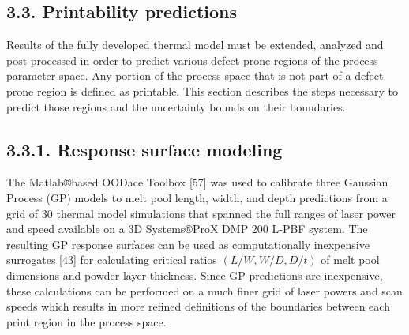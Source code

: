 \documentclass[10pt]{article}
\begin{document}
\subsection*{3.3. Printability predictions}
Results of the fully developed thermal model must be extended, analyzed and post-processed in order to predict various defect prone regions of the process parameter space. Any portion of the process space that is not part of a defect prone region is defined as printable. This section describes the steps necessary to predict those regions and the uncertainty bounds on their boundaries.

\subsection*{3.3.1. Response surface modeling}
The Matlab®based OODace Toolbox [57] was used to calibrate three Gaussian Process (GP) models to melt pool length, width, and depth predictions from a grid of 30 thermal model simulations that spanned the full ranges of laser power and speed available on a 3D Systems®ProX DMP 200 L-PBF system. The resulting GP response surfaces can be used as computationally inexpensive surrogates [43] for calculating critical ratios $(L / W, W / D, D / t)$ of melt pool dimensions and powder layer thickness. Since GP predictions are inexpensive, these calculations can be performed on a much finer grid of laser powers and scan speeds which results in more refined definitions of the boundaries between each print region in the process space.
\end{document}
